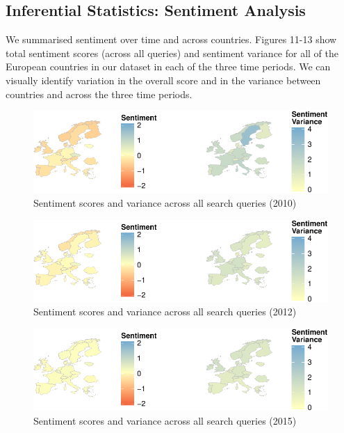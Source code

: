 \documentclass[]{article}
\begin{document}
\newpage

\subsection{Inferential Statistics: Sentiment
Analysis}\label{inferential-statistics-sentiment-analysis}

We summarised sentiment over time and across countries. Figures 11-13
show total sentiment scores (across all queries) and sentiment variance
for all of the European countries in our dataset in each of the three
time periods. We can visually identify variation in the overall score
and in the variance between countries and across the three time periods.

\begin{figure}[htbp]
\centering
\includegraphics{fin_paper_files/figure-latex/unnamed-chunk-12-1.pdf}
\caption{Sentiment scores and variance across all search queries (2010)}
\end{figure}

\begin{figure}[htbp]
\centering
\includegraphics{fin_paper_files/figure-latex/unnamed-chunk-13-1.pdf}
\caption{Sentiment scores and variance across all search queries (2012)}
\end{figure}

\begin{figure}[htbp]
\centering
\includegraphics{fin_paper_files/figure-latex/unnamed-chunk-14-1.pdf}
\caption{Sentiment scores and variance across all search queries (2015)}
\end{figure}
\end{document}
